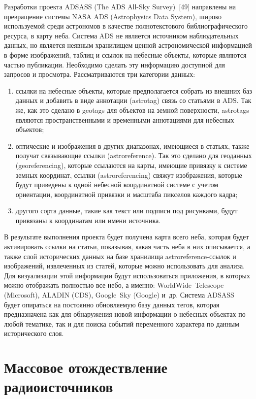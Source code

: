 \begin{multicols}{2}
      Разработки проекта ADSASS ({The ADS All-Sky Survey})~[49] направлены на 
превращение системы NASA ADS ({Astrophysics Data System}), широко 
используемой среди астрономов в качестве полнотекстового библиографического ресурса, в 
карту неба. Система ADS не является источником наблю\-да\-тель\-ных данных, но является 
неявным хранилищем ценной астрономической информацией в форме изображений, таблиц 
и ссылок на небесные объекты, которые являются частью публикации. Необходимо сделать 
эту информацию доступной для запросов и просмотра. Рассматриваются три категории 
данных: 
      \begin{enumerate}[(1)]
\item ссылки на небесные объекты, которые предполагается собрать из внешних баз 
данных и добавить в виде аннотации (astrotag) связь со стать\-ями в ADS. Так же, 
как это сделано в geotags для объектов на земной поверхности, astrotags 
являются пространственными и временными аннотациями для небесных объектов;
\item оптические и изображения в других диапазонах, имеющиеся в стать\-ях, также 
получат связывающие ссылки (astroreference). Так это сделано для геоданных 
(georeferencing), которые ссылаются на карты, имеющие привязку к сис\-те\-ме 
земных координат, ссылки (astroreferencing) свяжут изображения, которые будут 
приведены к одной небесной координатной сис\-те\-ме с учетом ориентации, координатной 
привязки и масштаба пикселов каждого кадра; 
\item другого сорта данные, такие как текст или подписи под рисунками, будут 
привязаны к координатам или имени источника. 
\end{enumerate}

В результате выполнения проекта будет получена карта всего неба, которая будет 
активировать ссылки на статьи, показывая, какая часть неба в них описывается, а также слой 
исторических данных на базе хранилища astroreference-ссы\-лок и изоб\-ра\-же\-ний, 
извлеченных из статей, которые можно использовать для анализа. Для визуализации этой 
информации будут использоваться приложения, в которых можно отображать полностью все 
небо, а именно: WorldWide\ Telescope (Microsoft), ALADIN (CDS), Google\ Sky 
(Google) и~др. Сис\-те\-ма ADSASS будет опираться на постоянно об\-нов\-ля\-емую базу данных 
тегов, которая предназначена как для обнаружения новой информации о небесных объектах 
по любой тематике, так и для поиска событий переменного характера по данным 
исторического слоя. 

\section{Массовое отождествление радиоисточников}


\end{multicols}

